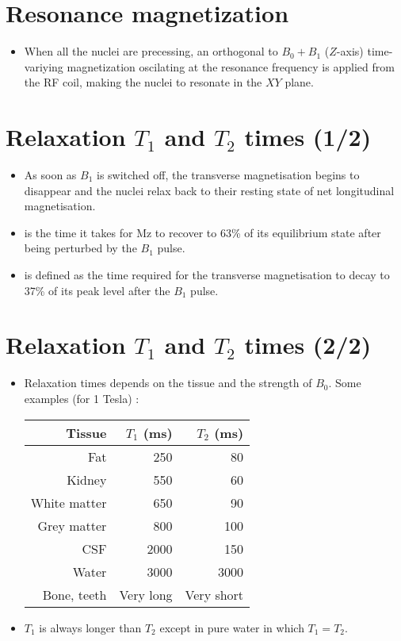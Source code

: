 \section{Resonance magnetization}
\begin{itemize}
\item When all the nuclei are precessing, an orthogonal to $B_0+B_1$
  ($Z$-axis) time-variying magnetization oscilating at the resonance
  frequency is applied from the RF coil, making the nuclei to resonate
  in the $XY$ plane.
\end{itemize}

\section{Relaxation $T_1$ and $T_2$ times (1/2)}
\begin{itemize}
\item As soon as $B_1$ is switched off, the transverse magnetisation
  begins to disappear and the nuclei relax back to their resting state
  of net longitudinal magnetisation. 
\item {} is the time it takes for Mz to recover to 63\% of its
  equilibrium state after being perturbed by the $B_1$ pulse.
\item {} is
  defined as the time required for the transverse magnetisation to
  decay to 37\% of its peak level after the $B_1$ pulse.
\end{itemize}

\section*{Relaxation $T_1$ and $T_2$ times (2/2)}
\begin{itemize}
\item Relaxation times depends on the tissue and the strength of
  $B_0$. Some examples (for 1 Tesla) \cite{abdulla2025MRI_T1T2}:
\begin{center}
  \begin{tabular}{r|rr}
    Tissue & $T_1$ (ms) & $T_2$ (ms) \\
    \hline
    Fat & 250 & 80 \\
    Kidney & 550 &  60 \\
    White matter & 650 & 90 \\
    Grey matter & 800 & 100 \\
    CSF & 2000 & 150 \\
    Water & 3000 & 3000 \\
    Bone, teeth & Very long & Very short
  \end{tabular}
\end{center}
\item $T_1$ is always longer than $T_2$ except in pure water in which
  $T_1=T_2$.
\end{itemize}

